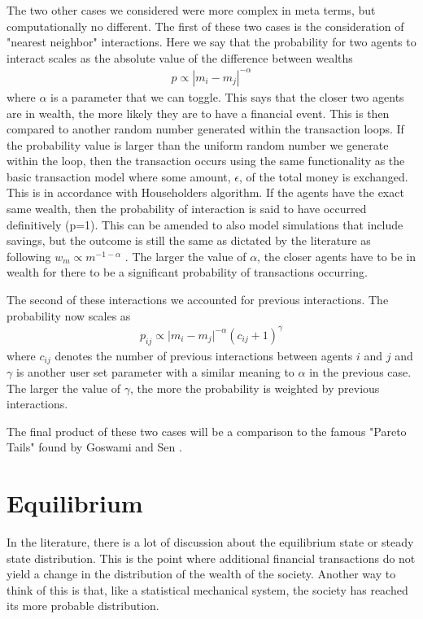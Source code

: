 \documentclass[11pt]{article}
\newcommand{\ba}{\[\begin{aligned}}
\newcommand{\ea}{\end{aligned}\]}
\begin{document}
The two other cases we considered were more complex in meta terms, but computationally no different. The first of these two cases is the consideration of "nearest neighbor" interactions. Here we say that the probability for two agents to interact scales as the absolute value of the difference between wealths
\ba
p \propto |m_i-m_j|^{-\alpha}
\ea
where $\alpha$ is a parameter that we can toggle. This says that the closer two agents are in wealth, the more likely they are to have a financial event. This is then compared to another random number generated within the transaction loops. If the probability value is larger than the uniform random number we generate within the loop, then the transaction occurs using the same functionality as the basic transaction model where some amount, $\epsilon$, of the total money is exchanged. This is in accordance with Householders algorithm. If the agents have the exact same wealth, then the probability of interaction is said to have occurred definitively (p=1). This can be amended to also model simulations that include savings, but the outcome is still the same as dictated by the literature as following $w_m \propto m^{-1-\alpha}$ \cite{goswami}. The larger the value of $\alpha$, the closer agents have to be in wealth for there to be a significant probability of transactions occurring.

The second of these interactions we accounted for previous interactions. The probability now scales as 
\ba
p_{ij} \propto \vert m_i-m_j\vert^{-\alpha}\left(c_{ij}+1\right)^{\gamma}
\ea
where $c_{ij}$ denotes the number of previous interactions between agents $i$ and $j$ and $\gamma$ is another user set parameter with a similar meaning to $\alpha$ in the previous case. The larger the value of $\gamma$, the more the probability is weighted by previous interactions.

The final product of these two cases will be a comparison to the famous "Pareto Tails" found by Goswami and Sen \cite{goswami}. 

\section{Equilibrium} 
In the literature, there is a lot of discussion about the equilibrium state or steady state distribution. This is the point where additional financial transactions do not yield a change in the distribution of the wealth of the society. Another way to think of this is that, like a statistical mechanical system, the society has reached its more probable distribution.
\end{document}
